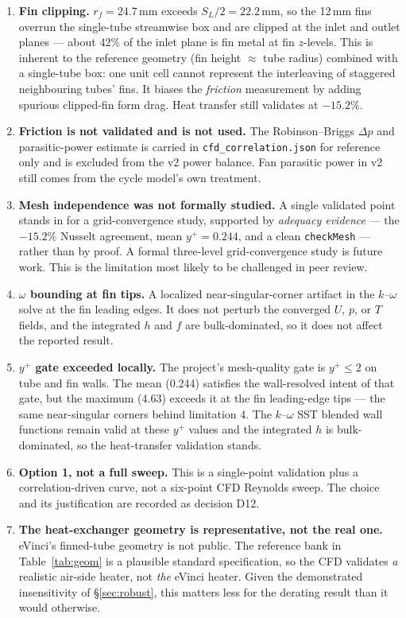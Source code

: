 \documentclass[11pt]{article}
\newcommand{\file}[1]{\texttt{\small #1}}
\begin{document}
\begin{enumerate}[leftmargin=1.6em,itemsep=3pt]
\item \textbf{Fin clipping.} $r_f = 24.7$\,mm exceeds $S_L/2 = 22.2$\,mm, so the 12\,mm fins overrun the
single-tube streamwise box and are clipped at the inlet and outlet planes --- about 42\% of the inlet plane is
fin metal at fin $z$-levels. This is inherent to the reference geometry (fin height $\approx$ tube radius)
combined with a single-tube box: one unit cell cannot represent the interleaving of staggered neighbouring
tubes' fins. It biases the \emph{friction} measurement by adding spurious clipped-fin form drag. Heat transfer
still validates at $-15.2\%$.

\item \textbf{Friction is not validated and is not used.} The Robinson--Briggs $\Delta p$ and
parasitic-power estimate is carried in \file{cfd\_correlation.json} for reference only and is excluded from
the v2 power balance. Fan parasitic power in v2 still comes from the cycle model's own treatment.

\item \textbf{Mesh independence was not formally studied.} A single validated point stands in for a
grid-convergence study, supported by \emph{adequacy evidence} --- the $-15.2\%$ Nusselt agreement, mean
$y^+ = 0.244$, and a clean \file{checkMesh} --- rather than by proof. A formal three-level grid-convergence
study is future work. This is the limitation most likely to be challenged in peer review.

\item \textbf{$\omega$ bounding at fin tips.} A localized near-singular-corner artifact in the $k$--$\omega$
solve at the fin leading edges. It does not perturb the converged $U$, $p$, or $T$ fields, and the integrated
$h$ and $f$ are bulk-dominated, so it does not affect the reported result.

\item \textbf{$y^+$ gate exceeded locally.} The project's mesh-quality gate is $y^+\leq2$ on tube and fin
walls. The mean (0.244) satisfies the wall-resolved intent of that gate, but the maximum (4.63) exceeds it at
the fin leading-edge tips --- the same near-singular corners behind limitation 4. The $k$--$\omega$ SST blended
wall functions remain valid at these $y^+$ values and the integrated $h$ is bulk-dominated, so the
heat-transfer validation stands.

\item \textbf{Option 1, not a full sweep.} This is a single-point validation plus a correlation-driven curve,
not a six-point CFD Reynolds sweep. The choice and its justification are recorded as decision D12.

\item \textbf{The heat-exchanger geometry is representative, not the real one.} eVinci's finned-tube
geometry is not public. The reference bank in Table~\ref{tab:geom} is a plausible standard specification, so
the CFD validates \emph{a} realistic air-side heater, not \emph{the} eVinci heater. Given the demonstrated
insensitivity of \S\ref{sec:robust}, this matters less for the derating result than it would otherwise.
\end{enumerate}
\end{document}
